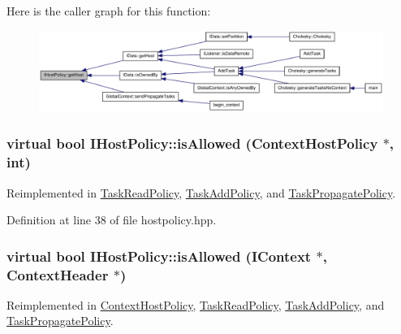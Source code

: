 Here is the caller graph for this function:\nopagebreak
\begin{figure}[H]
\begin{center}
\leavevmode
\includegraphics[width=420pt]{class_i_host_policy_ab759310a417532f33b513fbe1ac6aea8_icgraph}
\end{center}
\end{figure}
\hypertarget{class_i_host_policy_ad7665cb96e008e8f189201662ae32736}{
\subsubsection[{isAllowed}]{\setlength{\rightskip}{0pt plus 5cm}virtual bool IHostPolicy::isAllowed ({\bf ContextHostPolicy} $\ast$, \/  int)}}
\label{class_i_host_policy_ad7665cb96e008e8f189201662ae32736}


Reimplemented in \hyperlink{class_task_read_policy_a94a18c877a66a55844d538f47deb171d}{TaskReadPolicy}, \hyperlink{class_task_add_policy_a16f3ac4d4bf719e3020a4495d7498c3e}{TaskAddPolicy}, and \hyperlink{class_task_propagate_policy_af5be0fe1cf14a044035d62b5b40c2093}{TaskPropagatePolicy}.

Definition at line 38 of file hostpolicy.hpp.\hypertarget{class_i_host_policy_a5200e3143a640e492438361a3fd2626a}{
\subsubsection[{isAllowed}]{\setlength{\rightskip}{0pt plus 5cm}virtual bool IHostPolicy::isAllowed ({\bf IContext} $\ast$, \/  {\bf ContextHeader} $\ast$)}}
\label{class_i_host_policy_a5200e3143a640e492438361a3fd2626a}


Reimplemented in \hyperlink{class_context_host_policy_aa10ca0985dfed1351b9ef69fbe97f1f4}{ContextHostPolicy}, \hyperlink{class_task_read_policy_a10db4c46db394c083c73589cb998e5c3}{TaskReadPolicy}, \hyperlink{class_task_add_policy_a80261d7262611c29d2b483e4e73cc204}{TaskAddPolicy}, and \hyperlink{class_task_propagate_policy_a5dda297fceb4379ba92f8e2e0e899f2a}{TaskPropagatePolicy}.

